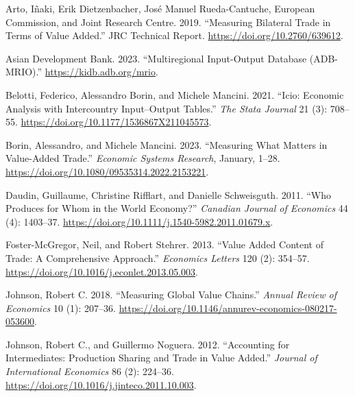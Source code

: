 \hypertarget{refs}{}
\begin{CSLReferences}{1}{0}
\leavevmode{}%
Arto, Iñaki, Erik Dietzenbacher, José Manuel Rueda-Cantuche, European Commission, and Joint Research Centre. 2019. {``Measuring {Bilateral} {Trade} in {Terms} of {Value} {Added}.''} JRC Technical Report. \url{https://doi.org/10.2760/639612}.

\leavevmode{}%
Asian Development Bank. 2023. {``Multiregional {Input}-{Output} {Database} ({ADB-MRIO}).''} \url{https://kidb.adb.org/mrio}.

\leavevmode{}%
Belotti, Federico, Alessandro Borin, and Michele Mancini. 2021. {``Icio: {Economic} Analysis with Intercountry Input--Output Tables.''} \emph{The Stata Journal} 21 (3): 708--55. \url{https://doi.org/10.1177/1536867X211045573}.

\leavevmode{}%
Borin, Alessandro, and Michele Mancini. 2023. {``Measuring What Matters in Value-Added Trade.''} \emph{Economic Systems Research}, January, 1--28. \url{https://doi.org/10.1080/09535314.2022.2153221}.

\leavevmode{}%
Daudin, Guillaume, Christine Rifflart, and Danielle Schweisguth. 2011. {``Who Produces for Whom in the World Economy?''} \emph{Canadian Journal of Economics} 44 (4): 1403--37. \url{https://doi.org/10.1111/j.1540-5982.2011.01679.x}.

\leavevmode{}%
Foster-McGregor, Neil, and Robert Stehrer. 2013. {``Value Added Content of Trade: {A} Comprehensive Approach.''} \emph{Economics Letters} 120 (2): 354--57. \url{https://doi.org/10.1016/j.econlet.2013.05.003}.

\leavevmode{}%
Johnson, Robert C. 2018. {``Measuring {Global} {Value} {Chains}.''} \emph{Annual Review of Economics} 10 (1): 207--36. \url{https://doi.org/10.1146/annurev-economics-080217-053600}.

\leavevmode{}%
Johnson, Robert C., and Guillermo Noguera. 2012. {``Accounting for Intermediates: {Production} Sharing and Trade in Value Added.''} \emph{Journal of International Economics} 86 (2): 224--36. \url{https://doi.org/10.1016/j.jinteco.2011.10.003}.


\end{CSLReferences}
